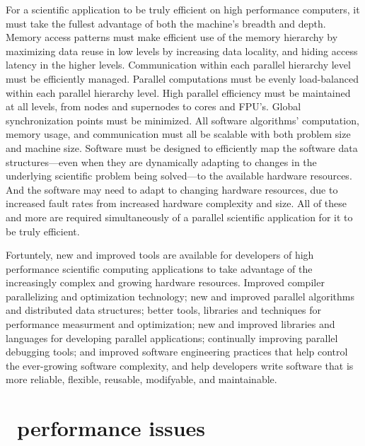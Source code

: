 \documentclass{article}
\begin{document}
For a scientific application to be truly efficient on high performance
computers, it must take the fullest advantage of both the machine's
breadth and depth.  Memory access patterns must make efficient use of
the memory hierarchy by maximizing data reuse in low levels by
increasing data locality, and hiding access latency in the higher
levels.  Communication within each parallel hierarchy level must be
efficiently managed.  Parallel computations must be evenly
load-balanced within each parallel hierarchy level.  High parallel
efficiency must be maintained at all levels, from nodes and supernodes
to cores and FPU's.  Global synchronization points must be minimized.
All software algorithms' computation, memory usage, and communication
must all be scalable with both problem size and machine size.
Software must be designed to efficiently map the software data
structures---even when they are dynamically adapting to changes in the
underlying scientific problem being solved---to the available hardware
resources.  And the software may need to adapt to changing hardware
resources, due to increased fault rates from increased hardware
complexity and size.  All of these and more are required
simultaneously of a parallel scientific application for it to be truly
efficient.

Fortuntely, new and improved tools are available for developers of
high performance scientific computing applications to take advantage
of the increasingly complex and growing hardware resources.  Improved
compiler parallelizing and optimization technology; new and improved
parallel algorithms and distributed data structures; better tools,
libraries and techniques for performance measurment and optimization;
new and improved libraries and languages for developing parallel
applications; continually improving parallel debugging tools; and
improved software engineering practices that help control the
ever-growing software complexity, and help developers write software
that is more reliable, flexible, reusable, modifyable, and
maintainable.

\section{\enzo\ performance issues}

\newcommand{\REF}[1]{\ref{#1}}
\newcommand{\TAG}[1]{\texttt{#1}}
\newcommand{\numgrids}{n}
\newcommand{\numprocs}{p}
\newcommand{\sizefield}{|F|}
\newcommand{\sizefields}{\sum_i^n |F_i|}
\newcommand{\sizegrid}{|G|}
\newcommand{\sizegridlocal}{|G_l|}
\newcommand{\sizegridremote}{|G_r|}
\end{document}
